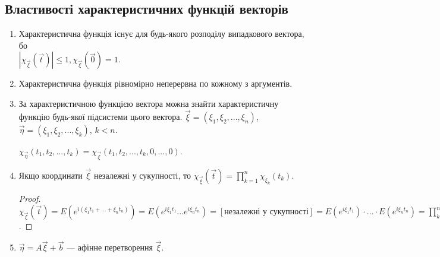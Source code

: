 \subsection{Властивості характеристичних функцій векторів}
\begin{enumerate}
    \item Характеристична функція існує для будь-якого розподілу випадкового вектора, бо \\
    $\left| \chi_{\vec{\xi}}(\vec{t})\right| \leq 1, \chi_{\vec{\xi}}(\vec{0}) = 1$.
    \item Характеристична функція рівномірно неперервна по кожному з аргументів.
    \item За характеристичною функцією вектора можна знайти 
    характеристичну функцію будь-якої підсистеми цього вектора.
    $\vec{\xi} = (\xi_1, \xi_2, ..., \xi_n)$, $\vec{\eta} = (\xi_1, \xi_2, ..., \xi_k)$, $k<n$.

    $\chi_{\vec{\eta}}(t_1, t_2, ..., t_k) = \chi_{\vec{\xi}}(t_1, t_2, ..., t_k, 0, ..., 0)$.
    \item Якщо координати $\vec{\xi}$ незалежні у сукупності, то $\chi_{\vec{\xi}}(\vec{t}) = \prod\limits_{k=1}^n \chi_{\xi_k}(t_k)$.
    \begin{proof}
        $\chi_{\vec{\xi}}(\vec{t}) = E\left( e^{i(\xi_1 t_1 + ... + \xi_n t_n)}\right) = 
        E\left( e^{i\xi_1 t_1} ... e^{i\xi_n t_n}\right) = \left[ \text{незалежні у сукупності}\right] =
        E\left( e^{i\xi_1 t_1}\right) \cdot ... \cdot E\left( e^{i\xi_n t_n}\right) = \prod\limits_{k=1}^n \chi_{\xi_k}(t_k)$.
    \end{proof}
    \item $\vec{\eta} = A\vec{\xi} + \vec{b}$ --- афінне перетворення $\vec{\xi}$.


\end{enumerate}
